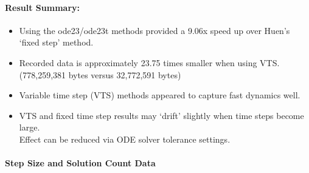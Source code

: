 \documentclass[12pt]{article}
\begin{document}
\paragraph{Result Summary:}
\begin{itemize}
\item Using the ode23/ode23t methods provided a 9.06x speed up over Huen's `fixed step' method.
\item Recorded data is approximately 23.75 times smaller when using VTS. \\ (778,259,381 bytes versus 32,772,591 bytes)
\item Variable time step (VTS) methods appeared to capture fast dynamics well. 
\item VTS and fixed time step results  may `drift' slightly when time steps become large. \\ Effect can be reduced via ODE solver tolerance settings.

\end{itemize}
\begin{table}[!ht]
\end{table}

\pagebreak
\paragraph{Step Size and Solution Count Data} \ \\
\end{document}
